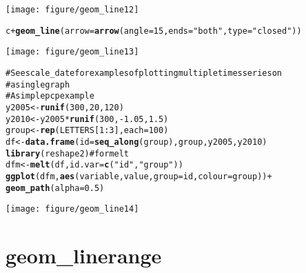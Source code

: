 \documentclass[a4paper,titlepage]{tufte-handout}\usepackage{graphicx, color}
\makeatletter
\def\maxwidth{ %
  \ifdim\Gin@nat@width>\linewidth
    \linewidth
  \else
    \Gin@nat@width
  \fi
}
\newcommand{\hlfunctioncall}[1]{\textcolor[rgb]{0.501960784313725,0,0.329411764705882}{\textbf{#1}}}%
\newcommand{\hlstring}[1]{\textcolor[rgb]{0.6,0.6,1}{#1}}%
\newcommand{\hlcomment}[1]{\textcolor[rgb]{0.180392156862745,0.6,0.341176470588235}{#1}}%
\newenvironment{kframe}{%
 \def\at@end@of@kframe{}%
 \ifinner\ifhmode%
  \def\at@end@of@kframe{\end{minipage}}%
  \begin{minipage}{\columnwidth}%
 \fi\fi%
 \def\FrameCommand##1{\hskip\@totalleftmargin \hskip-\fboxsep
 \colorbox{shadecolor}{##1}\hskip-\fboxsep
     \hskip-\linewidth \hskip-\@totalleftmargin \hskip\columnwidth}%
 \MakeFramed {\advance\hsize-\width
   \@totalleftmargin\z@ \linewidth\hsize
   \@setminipage}}%
 {\par\unskip\endMakeFramed%
 \at@end@of@kframe}
\newenvironment{knitrout}{}{} %
\makeatother
\begin{document}
\begin{knitrout}
\begin{kframe}
\begin{alltt}
\end{alltt}
\end{kframe}\texttt{[image: figure/geom\_line12]} \begin{kframe}\begin{alltt}
c + \hlfunctioncall{geom_line}(arrow = \hlfunctioncall{arrow}(angle = 15, ends = \hlstring{"both"}, type = \hlstring{"closed"}))
\end{alltt}
\end{kframe}\texttt{[image: figure/geom\_line13]} \begin{kframe}\begin{alltt}
\hlcomment{# See scale_date for examples of plotting multiple times series on}
\hlcomment{# a single graph}
\hlcomment{# A simple pcp example}
y2005 <- \hlfunctioncall{runif}(300, 20, 120)
y2010 <- y2005 * \hlfunctioncall{runif}(300, -1.05, 1.5)
group <- \hlfunctioncall{rep}(LETTERS[1:3], each = 100)
df <- \hlfunctioncall{data.frame}(id = \hlfunctioncall{seq_along}(group), group, y2005, y2010)
\hlfunctioncall{library}(reshape2) \hlcomment{# for melt}
dfm <- \hlfunctioncall{melt}(df, id.var = \hlfunctioncall{c}(\hlstring{"id"}, \hlstring{"group"}))
\hlfunctioncall{ggplot}(dfm, \hlfunctioncall{aes}(variable, value, group = id, colour = group)) +
  \hlfunctioncall{geom_path}(alpha = 0.5)
\end{alltt}
\end{kframe}\texttt{[image: figure/geom\_line14]} 
\end{knitrout}


\section{geom\_linerange}
\end{document}
